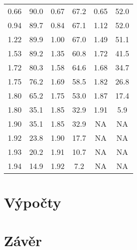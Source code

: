 \documentclass[10pt]{article}
\begin{document}
\begin{footnotesize}
\begin{minipage}[t]{.5\textwidth}
\begin{tabular}[b]{|c|c|c|c|c|c|}
0.66 & 90.0 & 0.67 & 67.2 & 0.65 & 52.0 \\
0.94 & 89.7 & 0.84 & 67.1 & 1.12 & 52.0 \\
1.22 & 89.9 & 1.00 & 67.0 & 1.49 & 51.1 \\
1.53 & 89.2 & 1.35 & 60.8 & 1.72 & 41.5 \\
1.72 & 80.3 & 1.58 & 64.6 & 1.68 & 34.7 \\
1.75 & 76.2 & 1.69 & 58.5 & 1.82 & 26.8 \\
1.80 & 65.2 & 1.75 & 53.0 & 1.87 & 17.4 \\
1.80 & 35.1 & 1.85 & 32.9 & 1.91 & 5.9 \\
1.90 & 35.1 & 1.85 & 32.9 & NA & NA \\
1.92 & 23.8 & 1.90 & 17.7 & NA & NA \\
1.93 & 20.2 & 1.91 & 10.7 & NA & NA \\
1.94 & 14.9 & 1.92 & 7.2 & NA & NA \\
\hline
\end{tabular}
\end{minipage}
\end{footnotesize}

\section{Výpočty}
\section{Závěr} 
\end{document}
